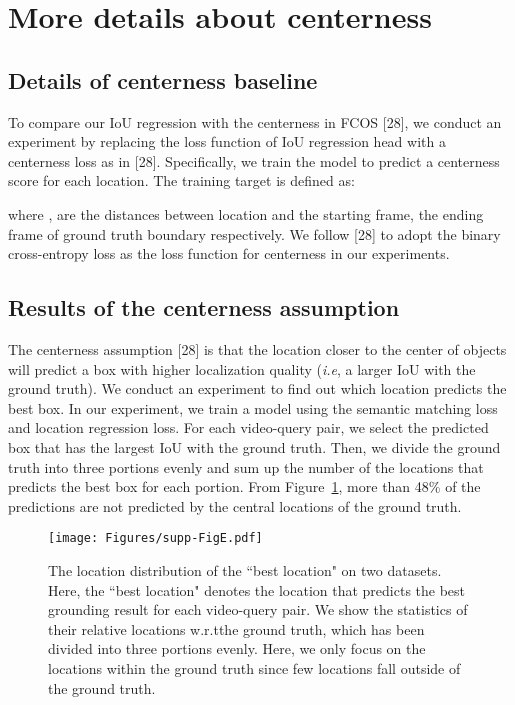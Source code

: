 \documentclass[10pt,twocolumn,letterpaper]{article}
\def\ie{\emph{i.e}\onedot} \def\Ie{\emph{I.e}\onedot}
\def\wrt{w.r.t\onedot} \def\dof{d.o.f\onedot}
\begin{document}
\section{More details about centerness}
\label{sec:centerness}

\subsection{Details of centerness baseline}

To compare our IoU regression with the centerness in FCOS [28], we conduct an experiment by replacing the loss function of IoU regression head with a centerness loss as in [28]. Specifically, we train the model to predict a centerness score for each location. The training target is defined as:

where ,  are the distances between location  and the starting frame, the ending frame of ground truth boundary respectively. We follow [28] to adopt the binary cross-entropy loss as the loss function for centerness in our experiments.




\subsection{Results of the centerness assumption}

The centerness assumption [28] is that the location closer to the center of objects will predict a box with higher localization quality (\ie, a larger IoU with the ground truth). We conduct an experiment to find out which location predicts the best box. In our experiment, we train a model using the semantic matching loss and location regression loss.
For each video-query pair, we select the predicted box that has the largest IoU with the ground truth.
Then, we divide the ground truth into three portions evenly and sum up the number of the locations that predicts the best box for each portion.
From Figure~\ref{fig:centerness}, more than 48\% of the predictions are not predicted by the central locations of the ground truth.

\begin{figure}[!t]
	\centering
	\texttt{[image: Figures/supp-FigE.pdf]}
	\caption{The location distribution of the ``best location" on two datasets. Here, the ``best location" denotes the location that predicts the best grounding result for each video-query pair. We show the statistics of their relative locations \wrt the ground truth, which has been divided into three portions evenly. Here, we only focus on the locations within the ground truth since few locations fall outside of the ground truth.}
	\label{fig:centerness}
\end{figure}


	
\end{document}

